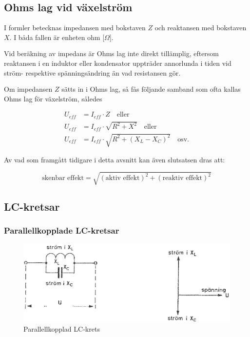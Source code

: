 \subsection{Ohms lag vid växelström}

I formler betecknas impedansen med bokstaven \(Z\) och reaktansen med bokstaven
\(X\).
I båda fallen är enheten ohm [\(\Omega\)].

Vid beräkning av impedans är Ohms lag inte direkt tillämplig, eftersom
reaktansen i en induktor eller kondensator uppträder annorlunda i tiden vid
ström- respektive spänningsändring än vad resistansen gör.

Om impedansen \(Z\) sätts in i Ohms lag, så fås följande samband som ofta kallas
Ohms lag för växelström, således

\begin{align*}
  U_{eff} &= I_{eff} \cdot Z \quad \text{eller} \\
  U_{eff} &= I_{eff} \cdot \sqrt{R^2 + X^2} \quad \text{eller} \\
  U_{eff} &= I_{eff} \cdot \sqrt{R^2 + (X_L - X_C)^2} \quad \text{osv.}
\end{align*}

Av vad som framgått tidigare i detta avsnitt kan även slutsatsen dras att:

\[
\text{skenbar effekt} = \sqrt{(\text{aktiv effekt})^2 + (\text{reaktiv effekt})^2}
\]

\subsection{LC-kretsar}

\subsubsection{Parallellkopplade LC-kretsar}

\begin{figure}
\includegraphics[width=\textwidth]{images/cropped_pdfs/bild_2_3-15.pdf}
\caption{Parallellkopplad LC-krets}
\label{fig:BildII3-15}
\end{figure}

